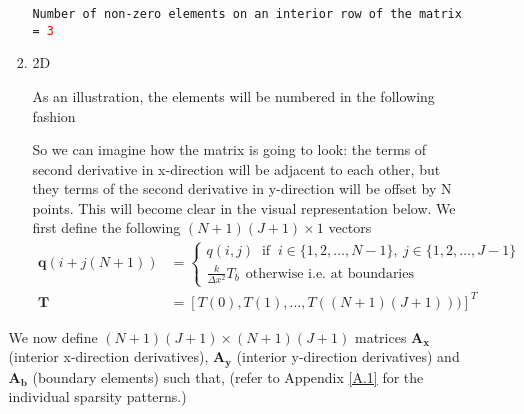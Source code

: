 \documentclass[12 pt, final]{article}
\begin{document}
\begin{itemize}
\begin{itemize}
\begin{enumerate}
                \texttt{Number of non-zero elements on an interior row of the matrix = \textcolor{red}{3}}  
                
                \item 2D
                
                As an illustration, the elements will be numbered in the following fashion
                
                
                So we can imagine how the matrix is going to look: the terms of second derivative in x-direction will be adjacent to each other, but they terms of the second derivative in y-direction will be offset by N points. This will become clear in the visual representation below.
                We first define the following $(N+1)(J+1) \times 1$ vectors
                \begin{align*}
                    \mathbf{q}(i+j(N+1)) &= \begin{cases}
                    q(i,j) \:\text{ if }\: i \in \{1,2,\hdots,N-1\},\: j \in \{1,2,\hdots,J-1\}\\
                    \frac{k}{\Delta x^2} T_b \:\:\text{otherwise i.e. at boundaries}
                    \end{cases}\\
                    \mathbf{T} &= [T(0) ,T(1),\hdots, T((N+1)(J+1)))]^T
                \end{align*}
            \end{enumerate}
            We now define $(N+1)(J+1)\times(N+1)(J+1)$ matrices $\mathbf{A_x}$ (interior x-direction derivatives), $\mathbf{A_y}$ (interior y-direction derivatives) and $\mathbf{A_b}$ (boundary elements) such that, (refer to Appendix \ref{A.1} for the individual sparsity patterns.)
            

\end{itemize}
\end{itemize}
\end{document}
